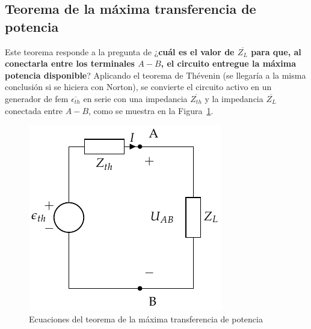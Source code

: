 \subsection{Teorema de la máxima transferencia de potencia}
Este teorema responde a la pregunta de ¿\textbf{cuál es el valor de $\overline{Z_L}$ para que, al conectarla entre los terminales $A-B$, el circuito entregue la máxima potencia disponible}? Aplicando el teorema de Thévenin (se llegaría a la misma conclusión si se hiciera con Norton), se convierte el circuito activo en un generador de fem $\overline{\epsilon_{th}}$ en serie con una impedancia $\overline{Z_{th}}$ y la impedancia $\overline{Z_L}$ conectada entre $A-B$, como se muestra en la Figura~\ref{fig.equivalenteThevenin0_ca}. 
\begin{figure}[H]
    \centering
    \includegraphics{../figs/EquivalenteThevenin0.pdf}
    \caption{Ecuaciones del teorema de la máxima transferencia de potencia}
    \label{fig.equivalenteThevenin0_ca}
\end{figure}

